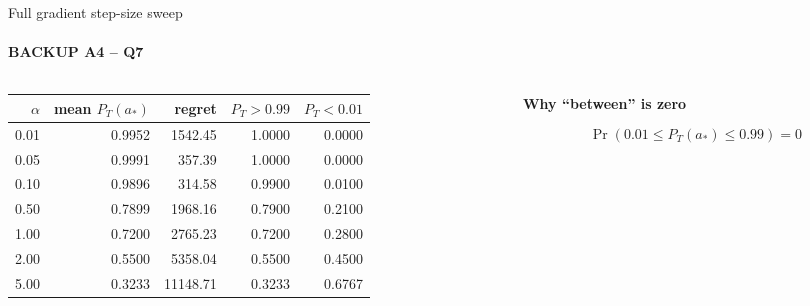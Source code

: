 \begin{frame}{Full gradient step-size sweep}
  \framesubtitle{BACKUP A4 -- Q7}
  \vspace{0.04cm}
  \begin{columns}[T,onlytextwidth]
    \begin{column}{0.62\textwidth}
      {\fontsize{9.1}{10.9}\selectfont
      \begin{tabular}{@{}rrrrr@{}}
        \toprule
        \(\alpha\) & mean \(P_T(a_*)\) & regret & \(P_T>0.99\) & \(P_T<0.01\)\\
        \midrule
        0.01 & 0.9952 & 1542.45 & 1.0000 & 0.0000\\
        0.05 & 0.9991 & 357.39 & 1.0000 & 0.0000\\
        0.10 & 0.9896 & 314.58 & 0.9900 & 0.0100\\
        0.50 & 0.7899 & 1968.16 & 0.7900 & 0.2100\\
        1.00 & 0.7200 & 2765.23 & 0.7200 & 0.2800\\
        2.00 & 0.5500 & 5358.04 & 0.5500 & 0.4500\\
        5.00 & 0.3233 & 11148.71 & 0.3233 & 0.6767\\
        \bottomrule
      \end{tabular}}
    \end{column}
    \begin{column}{0.33\textwidth}
      \textbf{Why ``between'' is zero}\par
      \vspace{0.12cm}
      \[
        \Pr(0.01\le P_T(a_*)\le0.99)=0
      \]
    \end{column}
  \end{columns}
\end{frame}
